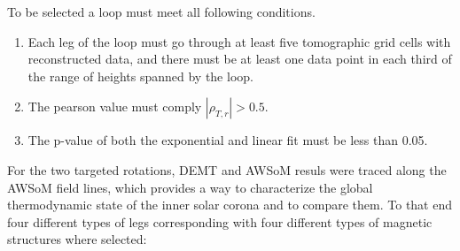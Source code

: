 \documentclass[namedreferences]{solarphysics}
\def\temp#1{\textcolor{mygray}{TEMPORAL: #1}}
\begin{document}
\begin{article}

To be selected a loop must meet all following conditions.

\begin{enumerate}

\item 
Each leg of the loop must go through at least five tomographic grid cells with reconstructed data, and there must be at least one data point in each third of the range of heights spanned by the loop.

\item 
The pearson value must comply $|\rho_{T,r}| > 0.5$.

\item 
The p-value of both the exponential and linear fit must be less than 0.05.

\end{enumerate}


For the two targeted rotations, DEMT and AWSoM resuls were traced along the AWSoM field lines, which provides a way to characterize the global thermodynamic state of the inner solar corona and to compare them. To that end four different types of legs corresponding with four different types of magnetic structures where selected:


\end{article}
\end{document}
